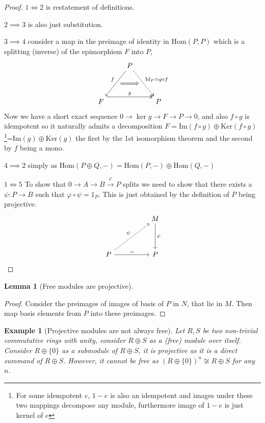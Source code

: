 \documentclass[12pt]{report}
\numberwithin{equation}{section}
\newcommand{\Hom}{{\mathrm{Hom}}}
\newcommand{\image}{{\mathrm{Im}}}
\newcommand{\kernel}{{\mathrm{Ker}}}
\newcounter{dummy} \numberwithin{dummy}{section}
\newtheorem{lemma}[dummy]{Lemma}
\newtheorem{example}[dummy]{Example}
\begin{document}
	\begin{proof}
		$1 \iff 2$ is restatement of definitions.
		
		$2 \implies 3$ is also just substitution.
		
		$3 \implies 4$ consider a map in the preimage of identity in $\Hom(P,P)$ which is a splitting (inverse) of the epimorphism $F$ into $P$,
		\[\begin{tikzcd}
			& P \\
			\\
			F && P
			\arrow["g", shift left=3, two heads, from=3-1, to=3-3]
			\arrow[""{name=0, anchor=center, inner sep=0}, "f"', from=1-2, to=3-1]
			\arrow[""{name=1, anchor=center, inner sep=0}, "{\mathrm{Id}_P=g \circ f}", dashed, two heads, from=1-2, to=3-3]
			\arrow[shorten <=6pt, shorten >=6pt, Rightarrow, from=0, to=1]
		\end{tikzcd}\]
		Now we have a short exact sequence $0 \to \ker g \to F \to P \to 0$, and also $f\circ g $ is idempotent so it naturally admits a decomposition $F = \image(f \circ g) \oplus \kernel (f \circ g)$\footnote{For some idempotent $e$, $1-e$ is also an idempotent and images under these two mappings decompose any module, furthermore image of $1-e$ is just kernel of $e$}=$\image (g) \oplus \kernel (g)$ the first by the 1st isomorphism theorem and the second by $f $ being a mono.
		
		$4 \implies 2$ simply as $\Hom (P \oplus Q,-) = \Hom(P,-) \oplus \Hom(Q,-)$
		
		$1 \iff 5$ To show that $0\to A \to B \xrightarrow{\varphi} P$ splits we need to show that there exists a $\psi: P \to B$ such that $\varphi \circ \psi = 1_P$. This is just obtained by the definition of $P$ being projective.
		\[\begin{tikzcd}
			&& M \\
			\\
			P && P
			\arrow["\varphi", from=1-3, to=3-3]
			\arrow["\psi", dashed, from=3-1, to=1-3]
			\arrow["{=}", from=3-1, to=3-3]
		\end{tikzcd}\]
		
	\end{proof}
	\begin{lemma}[Free modules are projective]
	\end{lemma}
	\begin{proof}
		Consider the preimages of images of basis of $P$ in $N$, that lie in $M$. Then map basis elements from $P$ into these preimages.
	\end{proof}
	\begin{example}[Projective modules are not always free]
		Let $R,S $ be two non-trivial commutative rings with unity, consider $R \oplus S$ as a (free) module over itself. Consider $R \oplus \{0\}$ as a submodule of $R \oplus S$, it is projective as it is a direct summand of $R \oplus S$. However, it cannot be free as $(R \oplus \{0\})^n \not \cong R\oplus S $ for any $n$.
	\end{example}
	
\end{document}
